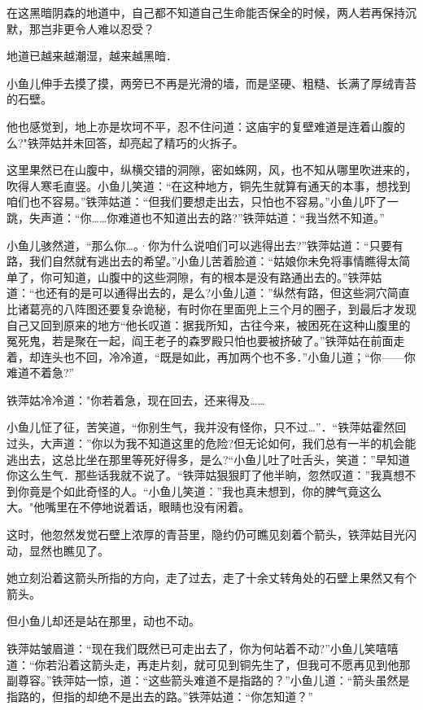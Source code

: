 \documentclass[12pt,oneside]{book}
\begin{document}
在这黑暗阴森的地道中，自己都不知道自己生命能否保全的时候，两人若再保持沉默，那岂非更令人难以忍受？

地道已越来越潮湿，越来越黑暗．

小鱼儿伸手去摸了摸，两旁已不再是光滑的墙，而是坚硬、粗糙、长满了厚绒青苔的石壁。

他也感觉到，地上亦是坎坷不平，忍不住问道：这庙宇的复壁难道是连着山腹的么?"铁萍姑并未回答，却亮起了精巧的火拆子。

这里果然已在山腹中，纵横交错的洞隙，密如蛛网，风，也不知从哪里吹进来的，吹得人寒毛直竖。小鱼儿笑道：``在这种地方，铜先生就算有通天的本事，想找到咱们也不容易。''铁萍姑道：``但我们要想走出去，只怕也不容易。''小鱼儿吓了一跳，失声道：``你\ldots\ldots 你难道也不知道出去的路?''铁萍姑道：``我当然不知道。''

小鱼儿骇然道，``那么你\ldots。·你为什么说咱们可以逃得出去?''铁萍姑道：``只要有路，我们自然就有逃出去的希望。''小鱼儿苦着脸道：``姑娘你未免将事情瞧得太简单了，你可知道，山腹中的这些洞隙，有的根本是没有路通出去的。''铁萍姑道：``也还有的是可以通得出去的，是么?小鱼儿道：''纵然有路，但这些洞穴简直比诸葛亮的八阵图还要复杂诡秘，有时你在里面兜上三个月的圈子，到最后才发现自己又回到原来的地方``他长叹道：据我所知，古往今来，被困死在这种山腹里的冤死鬼，若是聚在一起，阎王老子的森罗殿只怕也要被挤破了。''铁萍姑在前面走着，却连头也不回，冷冷道，``既是如此，再加两个也不多．''小鱼儿道；``你------你难道不着急?''

铁萍姑冷冷道："你若着急，现在回去，还来得及\ldots\ldots{}

小鱼儿怔了征，苦笑道，``你别生气，我并没有怪你，只不过\ldots{}''．``铁萍姑霍然回过头，大声道：''你以为我不知道这里的危险?但无论如何，我们总有一半的机会能逃出去，这总比坐在那里等死好得多，是么?``小鱼儿吐了吐舌头，笑道：''早知道你这么生气．那些话我就不说了。``铁萍姑狠狠盯了他半晌，忽然叹道：''我真想不到你竟是个如此奇怪的人。``小鱼儿笑道：''我也真未想到，你的脾气竟这么大。"他嘴里在不停地说着话，眼睛也没有闲着。

这时，他忽然发觉石壁上浓厚的青苔里，隐约仍可瞧见刻着个箭头，铁萍姑目光闪动，显然也瞧见了。

她立刻沿着这箭头所指的方向，走了过去，走了十余丈转角处的石壁上果然又有个箭头。

但小鱼儿却还是站在那里，动也不动。

铁萍姑皱眉道：``现在我们既然已可走出去了，你为何站着不动?''小鱼儿笑嘻嘻道：``你若沿着这箭头走，再走片刻，就可见到铜先生了，但我可不愿再见到他那副尊容。''铁萍姑一惊，道：``这些箭头难道不是指路的？''小鱼儿道：``箭头虽然是指路的，但指的却绝不是出去的路。''铁萍姑道：``你怎知道？''
\end{document}
